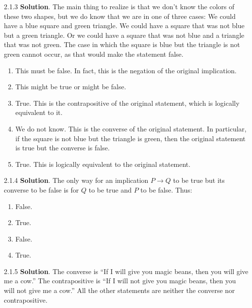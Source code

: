 \documentclass[11pt,]{book}
\theoremstyle{ptxplainnotitle}
\theoremstyle{ptxplaintitle}
\theoremstyle{ptxdefinitionnotitle}
\theoremstyle{ptxdefinitiontitle}
\theoremstyle{ptxdefinitionnotitle}
\theoremstyle{ptxdefinitiontitle}
\theoremstyle{ptxdefinitionnotitle}
\theoremstyle{ptxdefinitiontitle}
\theoremstyle{ptxdefinitiontitlenonumber}
\theoremstyle{ptxdefinitiontitlenonumber}
\numberwithin{equation}{chapter}
\newcommand{\imp}{\rightarrow}
\begin{document}
\begin{divisionexercise}{2.1.3}
\textbf{Solution}.\quad%
\hypertarget{p-2012}{}%
The main thing to realize is that we don't know the colors of these two shapes, but we do know that we are in one of three cases: We could have a blue square and green triangle.  We could have a square that was not blue but a green triangle.  Or we could have a square that was not blue and a triangle that was not green.  The case in which the square is blue but the triangle is not green cannot occur, as that would make the statement false. \leavevmode%
\begin{enumerate}[label=\alph*.]
\item\hypertarget{li-920}{}\hypertarget{p-2013}{}%
This must be false.  In fact, this is the negation of the original implication.%
\item\hypertarget{li-921}{}\hypertarget{p-2014}{}%
This might be true or might be false.%
\item\hypertarget{li-922}{}\hypertarget{p-2015}{}%
True.  This is the contrapositive of the original statement, which is logically equivalent to it.%
\item\hypertarget{li-923}{}\hypertarget{p-2016}{}%
We do not know.  This is the converse of the original statement.  In particular, if the square is not blue but the triangle is green, then the original statement is true but the converse is false.%
\item\hypertarget{li-924}{}\hypertarget{p-2017}{}%
True.  This is logically equivalent to the original statement.%
\end{enumerate}
%
\end{divisionexercise}%
\begin{divisionexercise}{2.1.4}
\textbf{Solution}.\quad%
\hypertarget{p-2049}{}%
The only way for an implication \(P\imp Q\) to be true but its converse to be false is for \(Q\) to be true and \(P\) to be false.  Thus: \leavevmode%
\begin{enumerate}[label=\alph*.]
\item\hypertarget{li-953}{}\hypertarget{p-2050}{}%
False.%
\item\hypertarget{li-954}{}\hypertarget{p-2051}{}%
True.%
\item\hypertarget{li-955}{}\hypertarget{p-2052}{}%
False.%
\item\hypertarget{li-956}{}\hypertarget{p-2053}{}%
True.%
\end{enumerate}
%
\end{divisionexercise}%
\begin{divisionexercise}{2.1.5}
\textbf{Solution}.\quad%
\hypertarget{p-2093}{}%
The converse is ``If I will give you magic beans, then you will give me a cow.''  The contrapositive is ``If I will not give you magic beans, then you will not give me a cow.''  All the other statements are neither the converse nor contrapositive.%
\end{divisionexercise}%
\end{document}
